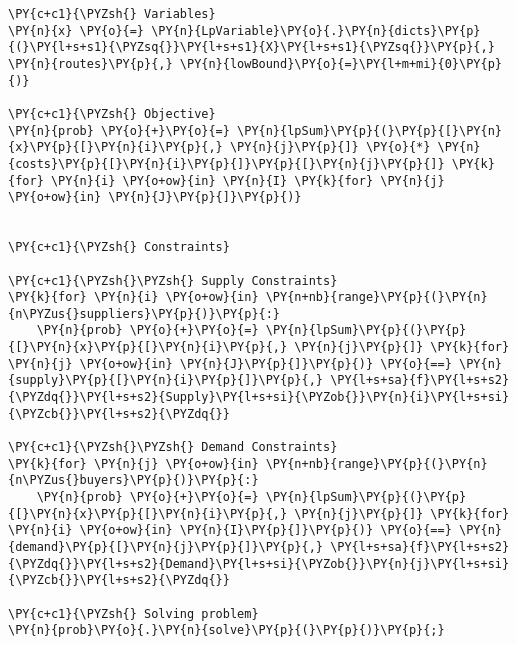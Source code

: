 \begin{tcolorbox}[breakable, size=fbox, boxrule=1pt, pad at break*=1mm,colback=cellbackground, colframe=cellborder]
\begin{Verbatim}[commandchars=\\\{\}]
\PY{c+c1}{\PYZsh{} Variables}
\PY{n}{x} \PY{o}{=} \PY{n}{LpVariable}\PY{o}{.}\PY{n}{dicts}\PY{p}{(}\PY{l+s+s1}{\PYZsq{}}\PY{l+s+s1}{X}\PY{l+s+s1}{\PYZsq{}}\PY{p}{,} \PY{n}{routes}\PY{p}{,} \PY{n}{lowBound}\PY{o}{=}\PY{l+m+mi}{0}\PY{p}{)}

\PY{c+c1}{\PYZsh{} Objective}
\PY{n}{prob} \PY{o}{+}\PY{o}{=} \PY{n}{lpSum}\PY{p}{(}\PY{p}{[}\PY{n}{x}\PY{p}{[}\PY{n}{i}\PY{p}{,} \PY{n}{j}\PY{p}{]} \PY{o}{*} \PY{n}{costs}\PY{p}{[}\PY{n}{i}\PY{p}{]}\PY{p}{[}\PY{n}{j}\PY{p}{]} \PY{k}{for} \PY{n}{i} \PY{o+ow}{in} \PY{n}{I} \PY{k}{for} \PY{n}{j} \PY{o+ow}{in} \PY{n}{J}\PY{p}{]}\PY{p}{)}


\PY{c+c1}{\PYZsh{} Constraints}

\PY{c+c1}{\PYZsh{}\PYZsh{} Supply Constraints}
\PY{k}{for} \PY{n}{i} \PY{o+ow}{in} \PY{n+nb}{range}\PY{p}{(}\PY{n}{n\PYZus{}suppliers}\PY{p}{)}\PY{p}{:}
    \PY{n}{prob} \PY{o}{+}\PY{o}{=} \PY{n}{lpSum}\PY{p}{(}\PY{p}{[}\PY{n}{x}\PY{p}{[}\PY{n}{i}\PY{p}{,} \PY{n}{j}\PY{p}{]} \PY{k}{for} \PY{n}{j} \PY{o+ow}{in} \PY{n}{J}\PY{p}{]}\PY{p}{)} \PY{o}{==} \PY{n}{supply}\PY{p}{[}\PY{n}{i}\PY{p}{]}\PY{p}{,} \PY{l+s+sa}{f}\PY{l+s+s2}{\PYZdq{}}\PY{l+s+s2}{Supply}\PY{l+s+si}{\PYZob{}}\PY{n}{i}\PY{l+s+si}{\PYZcb{}}\PY{l+s+s2}{\PYZdq{}}
    
\PY{c+c1}{\PYZsh{}\PYZsh{} Demand Constraints}
\PY{k}{for} \PY{n}{j} \PY{o+ow}{in} \PY{n+nb}{range}\PY{p}{(}\PY{n}{n\PYZus{}buyers}\PY{p}{)}\PY{p}{:}
    \PY{n}{prob} \PY{o}{+}\PY{o}{=} \PY{n}{lpSum}\PY{p}{(}\PY{p}{[}\PY{n}{x}\PY{p}{[}\PY{n}{i}\PY{p}{,} \PY{n}{j}\PY{p}{]} \PY{k}{for} \PY{n}{i} \PY{o+ow}{in} \PY{n}{I}\PY{p}{]}\PY{p}{)} \PY{o}{==} \PY{n}{demand}\PY{p}{[}\PY{n}{j}\PY{p}{]}\PY{p}{,} \PY{l+s+sa}{f}\PY{l+s+s2}{\PYZdq{}}\PY{l+s+s2}{Demand}\PY{l+s+si}{\PYZob{}}\PY{n}{j}\PY{l+s+si}{\PYZcb{}}\PY{l+s+s2}{\PYZdq{}}
    
\PY{c+c1}{\PYZsh{} Solving problem}
\PY{n}{prob}\PY{o}{.}\PY{n}{solve}\PY{p}{(}\PY{p}{)}\PY{p}{;}
\end{Verbatim}
\end{tcolorbox}

